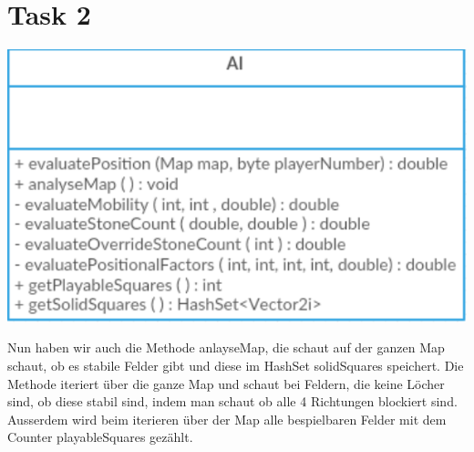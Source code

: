 \section{Task 2}
\begin{center}
\includegraphics[scale=0.8]{AIClassdiagram.pdf}
\end{center}

\noindent
Nun haben wir auch die Methode anlayseMap, die schaut auf der ganzen Map schaut, ob es stabile Felder gibt und diese im HashSet solidSquares speichert. Die Methode iteriert über die ganze Map und schaut bei Feldern, die keine Löcher sind, ob diese stabil sind, indem man schaut ob alle 4 Richtungen blockiert sind. Ausserdem wird beim iterieren über der Map alle bespielbaren Felder mit dem Counter playableSquares gezählt.
\newline

